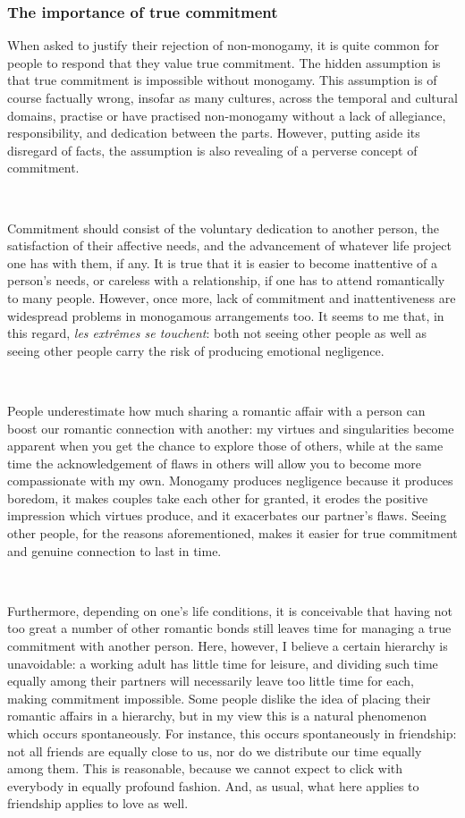 \documentclass[a4paper, 12pt]{article}
\begin{document}
\subsubsection{The importance of true commitment}

When asked to justify their rejection of non-monogamy, it is quite common for
people to respond that they value true commitment. The hidden assumption is
that true commitment is impossible without monogamy. This assumption is of
course factually wrong, insofar as many cultures, across the temporal and
cultural domains, practise or have practised non-monogamy without a lack of
allegiance, responsibility, and dedication between the parts. However, putting
aside its disregard of facts, the assumption is also revealing of a perverse
concept of commitment. 

~ 

Commitment should consist of the voluntary dedication to another person, the
satisfaction of their affective needs, and the advancement of whatever life
project one has with them, if any. It is true that it is easier to become 
inattentive of a person's needs, or careless with a relationship, if one has 
to attend romantically to many people. However, once more, lack of commitment 
and inattentiveness are widespread problems in monogamous arrangements too. It seems
to me that, in this regard, \textit{les extrêmes se touchent}: both not seeing other 
people as well as seeing other people carry the risk of producing emotional 
negligence. 

~

People underestimate how much sharing a romantic affair with a person can boost
our romantic connection with another: my virtues and singularities become
apparent when you get the chance to explore those of others, while at the same
time the acknowledgement of flaws in others will allow you to become more
compassionate with my own. Monogamy produces negligence because it produces
boredom, it makes couples take each other for granted, it erodes the positive
impression which virtues produce, and it exacerbates our partner's flaws.
Seeing other people, for the reasons aforementioned, makes it easier for true
commitment and genuine connection to last in time.

~ 

Furthermore, depending on one's life conditions, it is conceivable that having
not too great a number of other romantic bonds still leaves time for managing a 
true commitment with another person. Here, however, I believe a certain hierarchy 
is unavoidable: a working adult has little time for leisure, and dividing such time 
equally among their partners will necessarily leave too little time for each, making 
commitment impossible. Some people dislike the idea of placing their romantic affairs 
in a hierarchy, but in my view this is a natural phenomenon which occurs spontaneously.
For instance, this occurs spontaneously in friendship: not all friends are
equally close to us, nor do we distribute our time equally among them. This is
reasonable, because we cannot expect to click with everybody in equally
profound fashion. And, as usual, what here applies to friendship applies to
love as well.
\end{document}
